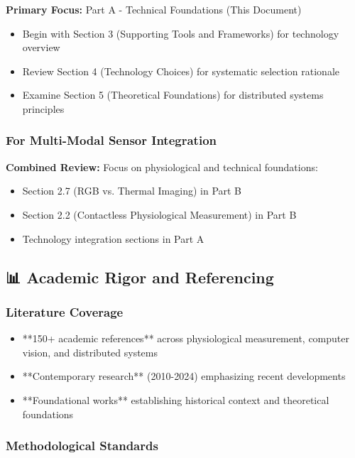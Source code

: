 \documentclass[11pt,a4paper]{article}
\begin{document}
\textbf{Primary Focus:} Part A - Technical Foundations (This Document)

\begin{itemize}
\item Begin with Section 3 (Supporting Tools and Frameworks) for technology overview
\item Review Section 4 (Technology Choices) for systematic selection rationale
\item Examine Section 5 (Theoretical Foundations) for distributed systems principles

\end{itemize}
\subsubsection{For Multi-Modal Sensor Integration}

\textbf{Combined Review:} Focus on physiological and technical foundations:

\begin{itemize}
\item Section 2.7 (RGB vs. Thermal Imaging) in Part B
\item Section 2.2 (Contactless Physiological Measurement) in Part B
\item Technology integration sections in Part A

\end{itemize}
\subsection{📊 Academic Rigor and Referencing}

\subsubsection{Literature Coverage}

\begin{itemize}
\item **150+ academic references** across physiological measurement, computer vision, and distributed systems
\item **Contemporary research** (2010-2024) emphasizing recent developments
\item **Foundational works** establishing historical context and theoretical foundations

\end{itemize}
\subsubsection{Methodological Standards}
\end{document}
